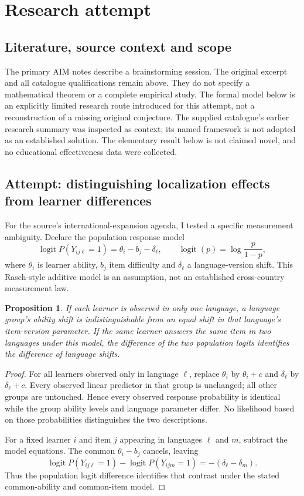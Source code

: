 \documentclass[11pt]{article}
\newtheorem{proposition}{Proposition}
\begin{document}
\section{Research attempt}
\subsection{Literature, source context and scope}
The primary AIM notes describe a brainstorming session. The original excerpt and all catalogue qualifications remain above. They do not specify a mathematical theorem or a complete empirical study. The formal model below is an explicitly limited research route introduced for this attempt, not a reconstruction of a missing original conjecture. The supplied catalogue's earlier research summary was inspected as context; its named framework is not adopted as an established solution. The elementary result below is not claimed novel, and no educational effectiveness data were collected.

\subsection{Attempt: distinguishing localization effects from learner differences}
For the source's international-expansion agenda, I tested a specific measurement ambiguity. Declare the population response model
\[
\operatorname{logit}P(Y_{ij\ell}=1)=\theta_i-b_j-\delta_\ell,
\qquad \operatorname{logit}(p)=\log\frac p{1-p},
\]
where $\theta_i$ is learner ability, $b_j$ item difficulty and $\delta_\ell$ a language-version shift. This Rasch-style additive model is an assumption, not an established cross-country measurement law.
\begin{proposition}
If each learner is observed in only one language, a language group's ability shift is indistinguishable from an equal shift in that language's item-version parameter. If the same learner answers the same item in two languages under this model, the difference of the two population logits identifies the difference of language shifts.
\end{proposition}
\begin{proof}
For all learners observed only in language $\ell$, replace $\theta_i$ by $\theta_i+c$ and $\delta_\ell$ by $\delta_\ell+c$. Every observed linear predictor in that group is unchanged; all other groups are untouched. Hence every observed response probability is identical while the group ability levels and language parameter differ. No likelihood based on those probabilities distinguishes the two descriptions.

For a fixed learner $i$ and item $j$ appearing in languages $\ell$ and $m$, subtract the model equations. The common $\theta_i-b_j$ cancels, leaving
\[
\operatorname{logit}P(Y_{ij\ell}=1)-\operatorname{logit}P(Y_{ijm}=1)
=-(\delta_\ell-\delta_m).
\]
Thus the population logit difference identifies that contrast under the stated common-ability and common-item model.
\end{proof}
\end{document}
